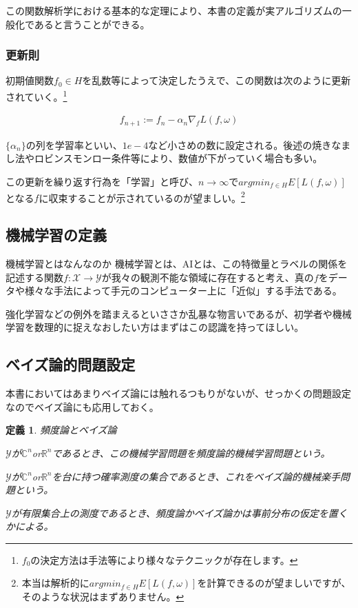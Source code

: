 \documentclass{jsarticle}
\newtheorem{defi}{定義}[section]
\begin{document}
この関数解析学における基本的な定理により、本書の定義が実アルゴリズムの一般化であると言うことができる。

\subsubsection{更新則}

初期値関数$f_0\in H$を乱数等によって決定したうえで、この関数は次のように更新されていく。\footnote{$f_0$の決定方法は手法等により様々なテクニックが存在します。}

\begin{align}
f_{n+1}:=f_n-\alpha_n \nabla_f L(f,\omega)
\end{align}

$\{\alpha_n\}$の列を学習率といい、$1e-4$など小さめの数に設定される。後述の焼きなまし法やロビンスモンロー条件等により、数値が下がっていく場合も多い。

この更新を繰り返す行為を「学習」と呼び、$n\to \infty$で$argmin_{f\in H} E[L(f,\omega)]$となる$f$に収束することが示されているのが望ましい。\footnote{本当は解析的に$argmin_{f\in H} E[L(f,\omega)]$を計算できるのが望ましいですが、そのような状況はまずありません。}

\subsection{機械学習の定義}

\begin{itembox}[l]{機械学習とはなんなのか}
機械学習とは、AIとは、この特徴量とラベルの関係を記述する関数$f:\mathcal{X}\to \mathcal{Y}$が我々の観測不能な領域に存在すると考え、真の$f$をデータや様々な手法によって手元のコンピューター上に「近似」する手法である。
\end{itembox}

強化学習などの例外を踏まえるといささか乱暴な物言いであるが、初学者や機械学習を数理的に捉えなおしたい方はまずはこの認識を持ってほしい。


\subsection{ベイズ論的問題設定}

本書においてはあまりベイズ論には触れるつもりがないが、せっかくの問題設定なのでベイズ論にも応用しておく。

\begin{defi} 頻度論とベイズ論

$\mathcal{Y}$が$\mathbb{C}^n$or$\mathbb{R}^n$であるとき、この機械学習問題を頻度論的機械学習問題という。

$\mathcal{Y}$が$\mathbb{C}^n$or$\mathbb{R}^n$を台に持つ確率測度の集合であるとき、これをベイズ論的機械楽手問題という。

$\mathcal{Y}$が有限集合上の測度であるとき、頻度論かベイズ論かは事前分布の仮定を置くかによる。

\end{defi}
\end{document}
